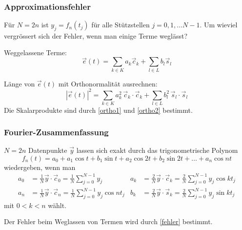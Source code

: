%
%
\begin{frame}
\frametitle{Approximationsfehler}
\begin{frage}
Für $N=2n$ ist $y_j=f_n(t_j)$ für alle Stützstellen $j=0,1,\dots N-1$.
Um wieviel vergrössert sich der Fehler, wenn man einige Terme weglässt?
\end{frage}

Weggelassene Terme:
\[
\vec{e}(t)
=
\sum_{k\in K}a_k\vec{c}_k
+
\sum_{l\in L}b_l\vec{s}_l
\]

\begin{antwort}
Länge von $\vec{e}(t)$ mit Orthonormalität ausrechnen:
\begin{equation}
|\vec{e}(t)|^2
=
\sum_{k\in K} a_k^2\, \vec{c}_k\cdot\vec{c}_k
+
\sum_{l\in L} b_l^2\, \vec{s}_l\cdot\vec{s}_l
\label{fehler}
\end{equation}
Die Skalarprodukte sind durch
\eqref{ortho1}
und
\eqref{ortho2}
bestimmt.
\end{antwort}
\end{frame}

%
%
\begin{frame}
\frametitle{Fourier-Zusammenfassung}
$N=2n$ Datenpunkte $\vec{y}$ lassen sich exakt durch das
trigonometrische Polynom
\[
f_n(t)
=
a_0 + a_1\cos t+b_1\sin t + a_2\cos 2t + b_2\sin 2t + \dots + a_n\cos nt
\]
wiedergeben, wenn man
\begin{align*}
a_0
&=
\frac1N\vec{y}\cdot\vec{c}_0
=
\frac1N\sum_{j=0}^{N-1} y_j
&
a_k
&=
\frac2N\vec{y}\cdot\vec{c}_k
=
\frac2N\sum_{j=0}^{N-1} y_j\cos kt_j
\\
a_n
&=
\frac1N\vec{y}\cdot\vec{c}_n
=
\frac1N\sum_{j=0}^{N-1} y_j\cos nt_j
&
b_k
&=
\frac2N\vec{y}\cdot\vec{s}_k
=
\frac2N\sum_{j=0}^{N-1} y_j\sin kt_j
\end{align*}
mit $0<k<n$
wählt.
\bigskip

Der Fehler beim Weglassen von Termen wird durch \eqref{fehler}
bestimmt.

\end{frame}


